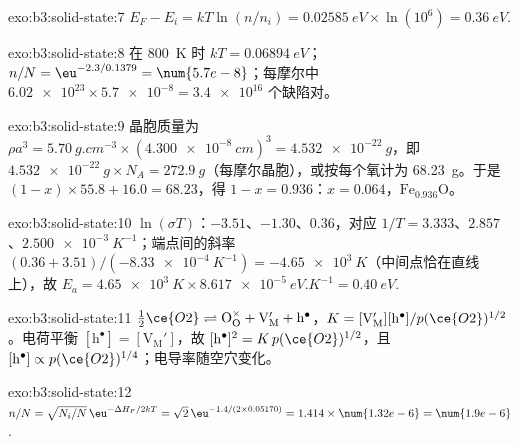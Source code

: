 \begin{solution}{exo:b3:solid-state:7}
$E_F - E_i = kT\ln(n/n_i) = \qty{0.02585}{eV} \times \ln(10^6) = \qty{0.36}{eV}$.
\end{solution}

\begin{solution}{exo:b3:solid-state:8}
在 \qty{800}{K} 时 $kT = \qty{0.06894}{eV}$；$n/N = \eu^{-2.3/0.1379} = \num{5.7e-8}$；每摩尔中 $\num{6.02e23} \times \num{5.7e-8} = \num{3.4e16}$
个缺陷对。
\end{solution}

\begin{solution}{exo:b3:solid-state:9}
晶胞质量为 $\rho a^3 = \qty{5.70}{g.cm^{-3}} \times (\qty{4.300e-8}{cm})^3 = \qty{4.532e-22}{g}$，即
$\qty{4.532e-22}{g} \times N_A = \qty{272.9}{g}$（每摩尔晶胞），或按每个氧计为 \qty{68.23}{g}。于是
$(1 - x) \times 55.8 + 16.0 = 68.23$，得 $1 - x = 0.936$：$x = 0.064$，$\mathrm{Fe_{0.936}O}$。
\end{solution}

\begin{solution}{exo:b3:solid-state:10}
$\ln(\sigma T)$：$-3.51$、$-1.30$、$0.36$，对应 $1/T = 3.333$、$2.857$、$\qty{2.500e-3}{K^{-1}}$；端点间的斜率
$(0.36 + 3.51)/(-\qty{8.33e-4}{K^{-1}}) = -\qty{4.65e3}{K}$（中间点恰在直线上），故
$E_a = \qty{4.65e3}{K} \times \qty{8.617e-5}{eV.K^{-1}} = \qty{0.40}{eV}$.
\end{solution}

\begin{solution}{exo:b3:solid-state:11}
$\tfrac12\ce{O2} \rightleftharpoons \mathrm{O_O^{\times} + V_M' + h^{\bullet}}$，$K = [\mathrm{V_M'}][\mathrm h^\bullet]/p(\ce{O2})^{1/2}$。电荷平衡 $[\mathrm h^\bullet] = [\mathrm{V_M'}]$，故
$[\mathrm h^\bullet]^2 = K\,p(\ce{O2})^{1/2}$，且 $[\mathrm h^\bullet] \propto p(\ce{O2})^{1/4}$；电导率随空穴变化。
\end{solution}

\begin{solution}{exo:b3:solid-state:12}
$n/N = \sqrt{N_i/N}\,\eu^{-\Delta H_F/2kT} = \sqrt 2\,\eu^{-1.4/(2 \times 0.05170)} = 1.414 \times \num{1.32e-6} = \num{1.9e-6}$.
\end{solution}

